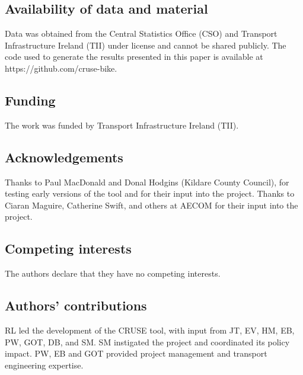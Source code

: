 \documentclass[
  super,
  preprint,
  3p]{elsarticle}
\begin{document}
\hypertarget{availability-of-data-and-material}{%
\subsection*{Availability of data and
material}\label{availability-of-data-and-material}}

Data was obtained from the Central Statistics Office (CSO) and Transport
Infrastructure Ireland (TII) under license and cannot be shared
publicly. The code used to generate the results presented in this paper
is available at https://github.com/cruse-bike.

\hypertarget{funding}{%
\subsection*{Funding}\label{funding}}

The work was funded by Transport Infrastructure Ireland (TII).

\hypertarget{acknowledgements}{%
\subsection*{Acknowledgements}\label{acknowledgements}}

Thanks to Paul MacDonald and Donal Hodgins (Kildare County Council), for
testing early versions of the tool and for their input into the project.
Thanks to Ciaran Maguire, Catherine Swift, and others at AECOM for their
input into the project.

\hypertarget{competing-interests}{%
\subsection*{Competing interests}\label{competing-interests}}

The authors declare that they have no competing interests.

\hypertarget{authors-contributions}{%
\subsection*{Authors' contributions}\label{authors-contributions}}

RL led the development of the CRUSE tool, with input from JT, EV, HM,
EB, PW, GOT, DB, and SM. SM instigated the project and coordinated its
policy impact. PW, EB and GOT provided project management and transport
engineering expertise.


  
\end{document}
